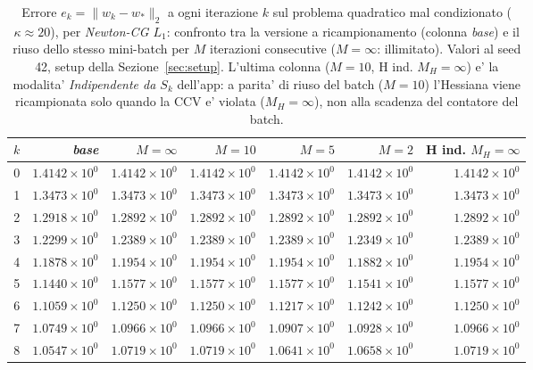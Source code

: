 \begin{table}[H]
\centering
\footnotesize
\renewcommand{\arraystretch}{0.85}
\setlength{\tabcolsep}{2pt}
\caption{Errore $e_k=\|w_k-w_*\|_2$ a ogni iterazione $k$ sul problema quadratico mal condizionato ($\kappa\approx 20$), per \emph{Newton-CG $L_1$}: confronto tra la versione a ricampionamento (colonna \emph{base}) e il riuso dello stesso mini-batch per $M$ iterazioni consecutive ($M=\infty$: illimitato). Valori al seed 42, setup della Sezione~\ref{sec:setup}. L'ultima colonna ($M{=}10$, H ind. $M_H{=}\infty$) e' la modalita' \emph{Indipendente da $S_k$} dell'app: a parita' di riuso del batch ($M=10$) l'Hessiana viene ricampionata solo quando la CCV e' violata ($M_H=\infty$), non alla scadenza del contatore del batch.}
\label{tab:riuso_malcond_l1}
\begin{tabular}{@{}rrrrrrr@{}}
\toprule
$k$ & \emph{base} & $M{=}\infty$ & $M{=}10$ & $M{=}5$ & $M{=}2$ & H ind. $M_H{=}\infty$\\
\midrule
0 & $1.4142\times10^{0}$ & $1.4142\times10^{0}$ & $1.4142\times10^{0}$ & $1.4142\times10^{0}$ & $1.4142\times10^{0}$ & $1.4142\times10^{0}$\\
1 & $1.3473\times10^{0}$ & $1.3473\times10^{0}$ & $1.3473\times10^{0}$ & $1.3473\times10^{0}$ & $1.3473\times10^{0}$ & $1.3473\times10^{0}$\\
2 & $1.2918\times10^{0}$ & $1.2892\times10^{0}$ & $1.2892\times10^{0}$ & $1.2892\times10^{0}$ & $1.2892\times10^{0}$ & $1.2892\times10^{0}$\\
3 & $1.2299\times10^{0}$ & $1.2389\times10^{0}$ & $1.2389\times10^{0}$ & $1.2389\times10^{0}$ & $1.2349\times10^{0}$ & $1.2389\times10^{0}$\\
4 & $1.1878\times10^{0}$ & $1.1954\times10^{0}$ & $1.1954\times10^{0}$ & $1.1954\times10^{0}$ & $1.1882\times10^{0}$ & $1.1954\times10^{0}$\\
5 & $1.1440\times10^{0}$ & $1.1577\times10^{0}$ & $1.1577\times10^{0}$ & $1.1577\times10^{0}$ & $1.1541\times10^{0}$ & $1.1577\times10^{0}$\\
6 & $1.1059\times10^{0}$ & $1.1250\times10^{0}$ & $1.1250\times10^{0}$ & $1.1217\times10^{0}$ & $1.1242\times10^{0}$ & $1.1250\times10^{0}$\\
7 & $1.0749\times10^{0}$ & $1.0966\times10^{0}$ & $1.0966\times10^{0}$ & $1.0907\times10^{0}$ & $1.0928\times10^{0}$ & $1.0966\times10^{0}$\\
8 & $1.0547\times10^{0}$ & $1.0719\times10^{0}$ & $1.0719\times10^{0}$ & $1.0641\times10^{0}$ & $1.0658\times10^{0}$ & $1.0719\times10^{0}$\\

\end{tabular}
\end{table}
